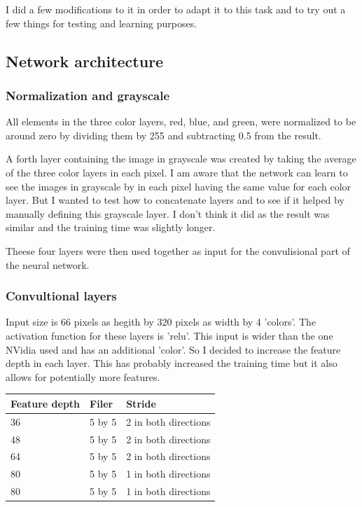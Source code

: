 \documentclass[12pt,a4paper]{article}
\begin{document}
I did a few modifications to it in order to adapt it to this task and to try out a few things for testing and learning purposes.

\subsection{Network architecture}

\subsubsection{Normalization and grayscale}
All elements in the three color layers, red, blue, and green, were normalized to be around zero by dividing them by 255 and subtracting 0.5 from the result.

A forth layer containing the image in grayscale was created by taking the average of the three color layers in each pixel. I am aware that the network can learn to see the images in grayscale by in each pixel having the same value for each color layer. But I wanted to test how to concatenate layers and to see if it helped by manually defining this grayscale layer. I don't think it did as the result was similar and the training time was slightly longer.

Theese four layers were then used together as input for the convulisional part of the neural network.

\subsubsection{Convultional layers}
Input size is 66 pixels as hegith by 320 pixels as width by 4 'colors'. The activation function for these layers is 'relu'. This input is wider than the one NVidia used and has an additional 'color'. So I decided to increase the feature depth in each layer. This has probably increased the training time but it also allows for potentially more features.

\begin{tabular}{| l | l | l |}
\hline
Feature depth & Filer & Stride \\
\hline
36 & 5 by 5 & 2 in both directions \\
48 & 5 by 5 & 2 in both directions \\
64 & 5 by 5 & 2 in both directions \\
80 & 5 by 5 & 1 in both directions \\
80 & 5 by 5 & 1 in both directions \\
\hline
\end{tabular}
\end{document}
